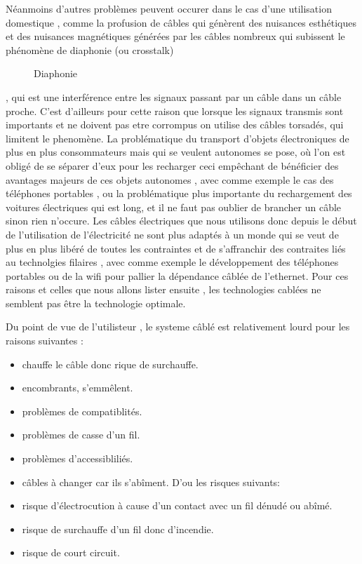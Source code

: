 \documentclass[12pt]{report}
\begin{document}
	Néanmoins d'autres problèmes peuvent occurer dans le cas d'une utilisation domestique , comme la profusion de câbles qui génèrent des nuisances esthétiques et des nuisances magnétiques générées par les câbles nombreux qui subissent le phénomène de diaphonie (ou crosstalk)\cite{wiki4}
\begin{figure}
  \begin{center}
    \setlength\fboxsep{0pt}
    \setlength\fboxrule{0.5pt}
  \end{center}
  \caption{Diaphonie}
\end{figure}, qui est une interférence entre les signaux passant par un câble dans un câble proche. C'est d'ailleurs pour cette raison que lorsque les signaux transmis sont importants et ne doivent pas etre corrompus on utilise des câbles torsadés,  qui limitent le phenomène. La problématique du transport d'objets électroniques de plus en plus consommateurs mais qui se veulent autonomes se pose, où l'on est obligé de se séparer d'eux pour les recharger ceci empêchant de bénéficier des avantages majeurs de ces objets autonomes , avec comme exemple le cas des téléphones portables , ou la problématique plus importante du rechargement des voitures électriques qui est long, et il ne faut pas oublier de brancher un câble sinon rien n'occure. Les câbles électriques que nous utilisons donc depuis le début de l'utilisation de l'électricité ne sont plus adaptés à un monde qui se veut de plus en plus libéré de toutes les contraintes et de s'affranchir des contraites liés au technolgies filaires , avec comme exemple le développement des téléphones portables ou de la wifi pour pallier la dépendance câblée de l'ethernet. Pour ces raisons et celles que nous allons lister ensuite , les technologies cablées ne semblent pas être la technologie optimale.

	Du point de vue de l'utilisteur , le systeme câblé est relativement lourd pour les raisons suivantes :
\begin{itemize}
	\item chauffe le câble donc rique de surchauffe.
	\item encombrants, s'emmêlent.
	\item problèmes de compatiblités.
	\item problèmes de casse d'un fil.
	\item problèmes d'accessibliliés.
	\item câbles à changer car ils s'abîment.
	D'ou les risques suivants:
	\item risque d'électrocution à cause d'un contact avec un fil dénudé ou abîmé.
	\item risque de surchauffe d'un fil donc d'incendie.
	\item risque de court circuit.
\end{itemize}
\end{document}
